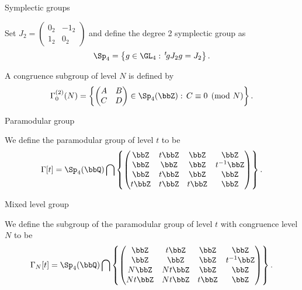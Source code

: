 \documentclass[mathserif,12pt]{beamer}
\begin{document}
\begin{frame}{Symplectic groups}
\begin{definition}
Set $J_2 = \begin{pmatrix} 0_2 & -1_2 \\ 1_2 & 0_2 \end{pmatrix}$ and define the degree 2 symplectic group as
\begin{align*}
\Sp_4 = \left\{ g \in \GL_4 :\, ^t\! g J_2 g = J_2 \right\}.
\end{align*}
\end{definition}

\pause

\begin{definition}
A congruence subgroup of level $N$ is defined by
\begin{align*}
\Gamma_0^{(2)}(N) = \left\{ \begin{pmatrix} A & B \\ C & D \end{pmatrix} \in \Sp_4(\bbZ) :\, C \equiv 0 \pmod{N} \right\}.
\end{align*}
\end{definition}
\end{frame}

\begin{frame}{Paramodular group}
\begin{definition}
We define the paramodular group of level $t$ to be
\begin{align*}
\Gamma[t] = \Sp_4(\bbQ) \bigcap \left\{ \begin{pmatrix} \bbZ & t \bbZ & \bbZ & \bbZ \\ \bbZ & \bbZ & \bbZ & t^{- 1} \bbZ \\ \bbZ & t \bbZ & \bbZ & \bbZ
\\ t \bbZ & t \bbZ & t \bbZ & \bbZ \end{pmatrix} \right\}.
\end{align*}
\end{definition}

\end{frame}

\begin{frame}{Mixed level group}

\begin{definition}
We define the subgroup of the paramodular group of level $t$ with congruence level $N$ to be
\begin{align*}
\Gamma_N[t] = \Sp_4(\bbQ) \bigcap \left\{ \begin{pmatrix} \bbZ & t \bbZ & \bbZ & \bbZ \\ \bbZ & \bbZ & \bbZ & t^{-1} \bbZ \\ N \bbZ & N t \bbZ & \bbZ &
\bbZ \\ N t \bbZ & N t \bbZ & t \bbZ & \bbZ \end{pmatrix} \right\}.
\end{align*}
\end{definition}
\end{frame}
\end{document}
